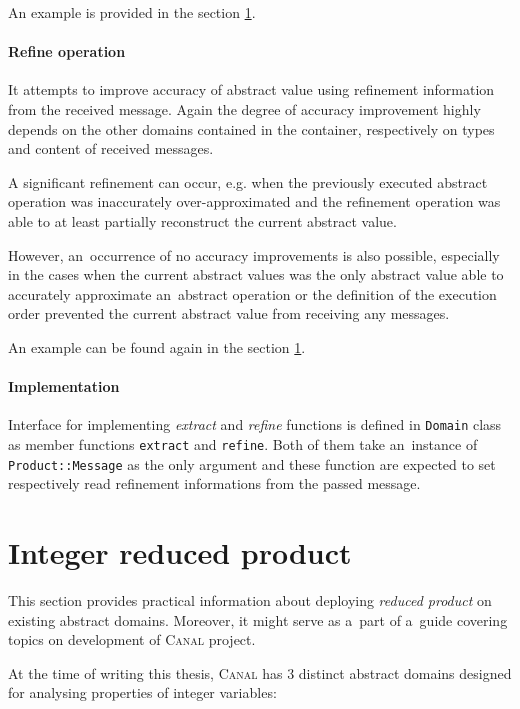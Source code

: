 \documentclass[12pt,oneside]{fithesis2}
\theoremstyle{definition}
\begin{document}
An example is provided in the section \ref{sec:integer-reduced-product}.

\paragraph{Refine operation}
It attempts to improve accuracy of abstract value using refinement information from the received message. Again the degree of accuracy improvement highly depends on the other domains contained in the container, respectively on types and content of received messages.

A significant refinement can occur, e.g. when the previously executed abstract operation was inaccurately over-approximated and the refinement operation was able to at least partially reconstruct the current abstract value.

However, an~occurrence of no accuracy improvements is also possible, especially in the cases when the current abstract values was the only abstract value able to accurately approximate an~abstract operation or the definition of the execution order prevented the current abstract value from receiving any messages.

An example can be found again in the section \ref{sec:integer-reduced-product}.

\paragraph{Implementation}
Interface for implementing \textit{extract} and \textit{refine} functions is defined in \texttt{Domain} class as member functions \texttt{extract} and \texttt{refine}. Both of them take an~instance of \texttt{Product::Message} as the only argument and these function are expected to set respectively read refinement informations from the passed message.

\section{Integer reduced product}\label{sec:integer-reduced-product}

This section provides practical information about deploying \textit{reduced product} on existing abstract domains. Moreover, it might serve as a~part of a~guide covering topics on development of \textsc{Canal} project.

At the time of writing this thesis, \textsc{Canal} has 3 distinct abstract domains designed for analysing properties of integer variables:
\end{document}

